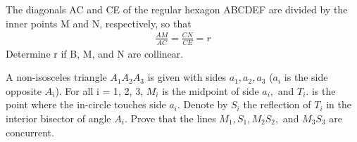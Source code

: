\item The diagonals AC and CE of the regular hexagon ABCDEF are divided by the inner points M and N, respectively, so that
\begin{align*}
\frac{AM}{AC} = \frac{CN}{CE} = r
\end{align*}
Determine r if B, M, and N are collinear.

\item A non-isosceles triangle $A_1A_2A_3$ is given with sides $a_1, a_2, a_3$ ($a_i$ is the side opposite $A_i$). For all i = 1, 2, 3, $M_i$ is the midpoint of side $a_i,$ and $T_i.$ is the point where the in-circle touches side $a_i.$ Denote by $S_i$ the reflection of $T_i$ in the interior bisector of angle $A_i.$ Prove that the lines $M_1, S_1, M_2S_2,$ and $M_3S_3$ are concurrent.


